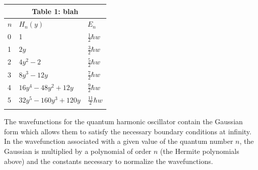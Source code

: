 \documentclass{article}
\begin{document}
\begin{table}[h]
\centering
\begin{tabular}{ l l l } 
\multicolumn{3}{c}{Table 1: blah}\\
\hline \hline
$n$ & $H_n(y)$ & $E_n$\\
 \hline
 0 & 1 										& $\frac{1}{2}\hbar w$\\\noalign{\smallskip}
 1 & $2y$ 									& $\frac{3}{2}\hbar w$\\\noalign{\smallskip}
 2 & $4y^2 - 2$ 						& $\frac{5}{2}\hbar w$\\\noalign{\smallskip}
 3 & $8y^3 - 12y$ 						& $\frac{7}{2}\hbar w$\\\noalign{\smallskip}
 4 & $16y^4 - 48y^2 + 12y$ 		& $\frac{9}{2}\hbar w$\\\noalign{\smallskip}
 5 & $32y^5 - 160y^3 + 120y$ 	& $\frac{11}{2}\hbar w$\\\noalign{\smallskip}
 \hline
\end{tabular}
\label{table:1}
\end{table}


\noindent
The wavefunctions for the quantum harmonic oscillator contain the Gaussian form which allows them to
satisfy the necessary boundary conditions at infinity. In the wavefunction associated with a given value of
the quantum number $n$, the Gaussian is multiplied by a polynomial of order $n$ (the Hermite polynomials
above) and the constants necessary to normalize the wavefunctions.
\end{document}
